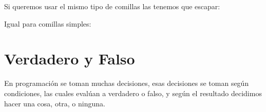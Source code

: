 \documentclass[letterpaper,10pt,spanish]{sphinxmanual}
\begin{document}
Si queremos usar el mismo tipo de comillas las tenemos que escapar:

%
\begin{sphinxVerbatim}[commandchars=\\\{\}]
\end{sphinxVerbatim}

%
\begin{sphinxVerbatim}[commandchars=\\\{\}]
 
\end{sphinxVerbatim}

Igual para comillas simples:

%
\begin{sphinxVerbatim}[commandchars=\\\{\}]
\end{sphinxVerbatim}

%
\begin{sphinxVerbatim}[commandchars=\\\{\}]
 
\end{sphinxVerbatim}

%
\begin{sphinxVerbatim}[commandchars=\\\{\}]
\end{sphinxVerbatim}

%
\begin{sphinxVerbatim}[commandchars=\\\{\}]
 
\end{sphinxVerbatim}


\section{Verdadero y Falso}
\label{\detokenize{datos-con-javascript:verdadero-y-falso}}
En programación se toman muchas decisiones, esas decisiones se toman según
condiciones, las cuales evalúan a verdadero o falso, y según el resultado
decidimos hacer una cosa, otra, o ninguna.
\end{document}
